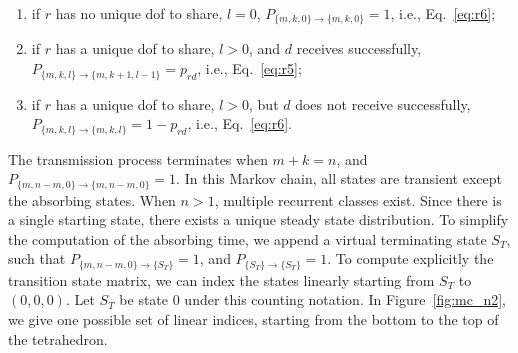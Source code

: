 \documentclass[journal, letterpaper]{IEEEtran}
\begin{document}
\begin{enumerate}
    \item if $r$ has no unique dof to share, $l=0$, $P_{\{m,k,0\}\rightarrow\{m,k,0\}} = 1$, i.e., Eq.~\eqref{eq:r6};
    \item if $r$ has a unique dof to share, $l>0$, and $d$ receives successfully,
            $P_{\{m,k,l\}\rightarrow\{m,k+1,l-1\}} = p_{rd}$, i.e., Eq.~\eqref{eq:r5};
    \item if $r$ has a unique dof to share, $l>0$, but $d$ does not receive successfully, $P_{\{m,k,l\}\rightarrow\{m,k,l\}} = 1-p_{rd}$, i.e., Eq.~\eqref{eq:r6}.
\end{enumerate}

The transmission process terminates when $m+k=n$, and $P_{\{m,n-m,0\}\rightarrow\{m,n-m,0\}}=1$. In this Markov chain, all states are transient except the absorbing states. When $n>1$, multiple recurrent classes exist. Since there is a single starting state, there exists a unique steady state distribution. To simplify the computation of the absorbing time, we append a virtual terminating state $S_T$, such that $P_{\{m,n-m,0\}\rightarrow\{S_T\}}=1$, and $P_{\{S_T\}\rightarrow\{S_T\}}=1$. To compute explicitly the transition state matrix, we can index the states linearly starting from $S_T$ to $(0,0,0)$. Let $S_T$ be state 0 under this counting notation. In Figure~\ref{fig:mc_n2}, we give one possible set of linear indices, starting from the bottom to the top of the tetrahedron.
\end{document}

